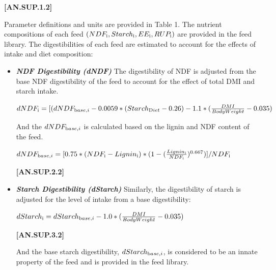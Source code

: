 \documentclass{article}
\begin{document}
\begin{refsection}
\begin{itemize}
            {\raggedleft \textbf{[AN.SUP.1.2]}\par}
            \vspace{0.5cm}

Parameter definitions and units are provided in Table 1. The nutrient compositions of each feed \( (NDF_{\text i}, Starch_{\text i}, EE_{\text i}, RUP_{\text i} )\) are provided in the feed library. The digestibilities of each feed are estimated to account for the effects of intake and diet composition:
\vspace{0.5cm}
\begin{itemize}
    \item \textbf{\textit{NDF Digestibility (dNDF)} }
    \vspace{0.25cm}
    The digestibility of NDF is adjusted from the base NDF digestibility of the feed to account for the effect of total DMI and starch intake. 
    \begin{center}
    \(dNDF_{\text i} = [ (dNDF_{\text base,i} - 0.0059*(Starch_{\text Diet} - 0.26)  - 1.1*(\frac{DMI}{BodyWeight} - 0.035) \)
    
    \end{center}
And the \(dNDF_{\text base,i}\) is calculated based on the lignin and NDF content of the feed.
    \vspace{0.25cm}
    
    \begin{center}
    \(dNDF_{\text base,i} = [0.75* (NDF_{\text i} - Lignin_{\text i}) * (1-( \frac{ Lignin_{\text i} }{NDF_{\text i} })^{0.667})] / NDF_{\text i} \)
    
    \end{center}
    \vspace{0.5cm}
    
            {\raggedleft \textbf{[AN.SUP.2.2]}\par}
            \vspace{0.5cm}
    \item \textbf{\textit{Starch Digestibility (dStarch)} }
    \vspace{0.25cm}
    Similarly, the digestibility of starch is adjusted for the level of intake from a base digestibility: 
     \begin{center}
    \(dStarch_{\text i} = dStarch_{\text base,i} - 1.0*(\frac{DMI}{BodyWeight} - 0.035) \)
    
    \end{center}
    \vspace{0.5cm}
            {\raggedleft \textbf{[AN.SUP.3.2]}\par}
    \vspace{0.25cm}
    And the base starch digestibility, \(dStarch_{\text base,i}\), is considered to be an innate property of the feed and is provided in the feed library.
    \vspace{0.5cm}


\end{itemize}
\end{itemize}
\end{refsection}
\end{document}
